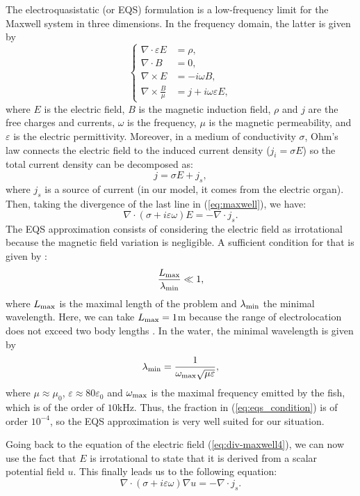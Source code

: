 \documentclass[final]{siamltex}
\numberwithin{equation}{section}
\numberwithin{figure}{section}
\numberwithin{table}{section}
\begin{document}
The electroquasistatic (or EQS) formulation is a low-frequency
limit for the Maxwell system in three dimensions. In the frequency
domain, the latter is given by
\begin{equation}
\left\{ \begin{alignedat}{1}\nabla\cdot\varepsilon {E} & =\rho,\\
\nabla\cdot {B} & =0,\\
\nabla\times {E} & =-i\omega {B},\\
\nabla\times\frac{ {B}}{\mu} & = {j}+i\omega\varepsilon {E},
\end{alignedat}
\right.\label{eq:maxwell}
\end{equation}
where $E$ is the electric field, $B$ is the magnetic induction
field, $\rho$ and $j$ are the free charges and currents, $\omega$
is the frequency, $\mu$ is the magnetic permeability, and
$\varepsilon$ is the electric permittivity. Moreover, in a medium
of conductivity $\sigma$, Ohm's law connects the electric field to
the induced current density (${j_{i}}=\sigma {E}$) so the total
current density can be decomposed as:
\[
{j}=\sigma {E}+ {j_{s}},
\]
 where ${j_{s}}$ is a source of current (in our model, it
comes from the electric organ). Then, taking the divergence of the
last line in (\ref{eq:maxwell}), we have:
\begin{equation}
\nabla\cdot(\sigma+i\varepsilon\omega) {E}=-\nabla\cdot
{j_{s}}.\label{eq:div-maxwell4}
\end{equation}
The EQS approximation consists of considering the electric field
as irrotational because the magnetic field variation is
negligible. A sufficient condition for that is given by
\cite{vanRienen2001}:
\begin{equation}
\frac{L_{\rm max}}{\lambda_{\rm min}}\ll1,\label{eq:eqs_condition}
\end{equation}
 where $L_{\rm max}$ is the maximal length of the problem and $\lambda_{\rm min}$
the minimal wavelength. Here, we can take $L_{\rm max}=1$m because
the range of electrolocation does not exceed two body lengths
\cite{moller1995}. In the water, the minimal wavelength is given
by
\[
\lambda_{\rm min}=\frac{1}{\omega_{\rm max}\sqrt{\mu\varepsilon}},
\]
 where $\mu\approx\mu_{0}$, $\varepsilon\approx80\varepsilon_{0}$
and $\omega_{\rm max}$ is the maximal frequency emitted by the
fish, which is of the order of $10$kHz. Thus, the fraction in
(\ref{eq:eqs_condition}) is of order $10^{-4}$, so the EQS
approximation is very well suited for our situation.

Going back to the equation of the electric field
(\ref{eq:div-maxwell4}), we can now use the fact that ${E}$ is
irrotational to state that it is derived from a  scalar potential
field $u$. This finally leads us to the following equation:
\begin{equation}
\nabla\cdot(\sigma+i\varepsilon\omega)\nabla u=-\nabla\cdot
{j_{s}}.\label{eq:EQS-PDE}
\end{equation}
\end{document}

